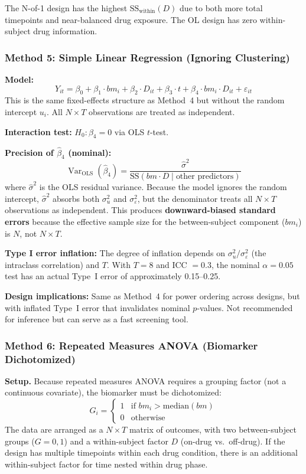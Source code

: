 \documentclass[11pt,letterpaper]{article}
\begin{document}
The N-of-1 design has the highest $\text{SS}_{\text{within}}(D)$ due to
both more total timepoints and near-balanced drug exposure. The OL
design has zero within-subject drug information.

\subsubsection{Method 5: Simple Linear Regression (Ignoring Clustering)}

\textbf{Model:}
\[
Y_{it} = \beta_0 + \beta_1 \cdot bm_i + \beta_2 \cdot D_{it}
+ \beta_3 \cdot t + \beta_4 \cdot bm_i \cdot D_{it}
+ \varepsilon_{it}
\]
This is the same fixed-effects structure as Method~4 but without the
random intercept $u_i$. All $N \times T$ observations are treated as
independent.

\textbf{Interaction test:} $H_0: \beta_4 = 0$ via OLS $t$-test.

\textbf{Precision of $\hat{\beta}_4$ (nominal):}
\[
\operatorname{Var}_{\text{OLS}}(\hat{\beta}_4) =
\frac{\hat{\sigma}^2}{\text{SS}(bm \cdot D \mid
\text{other predictors})}
\]
where $\hat{\sigma}^2$ is the OLS residual variance. Because the model
ignores the random intercept, $\hat{\sigma}^2$ absorbs both
$\sigma^2_u$ and $\sigma^2_\varepsilon$, but the denominator treats all
$N \times T$ observations as independent. This produces
\textbf{downward-biased standard errors} because the effective sample
size for the between-subject component ($bm_i$) is $N$, not $N \times T$.

\textbf{Type I error inflation:} The degree of inflation depends on
$\sigma^2_u / \sigma^2_\varepsilon$ (the intraclass correlation) and
$T$. With $T = 8$ and ICC $= 0.3$, the nominal $\alpha = 0.05$ test
has an actual Type~I error of approximately 0.15--0.25.

\textbf{Design implications:} Same as Method~4 for power ordering
across designs, but with inflated Type~I error that invalidates nominal
$p$-values. Not recommended for inference but can serve as a fast
screening tool.

\subsubsection{Method 6: Repeated Measures ANOVA (Biomarker Dichotomized)}

\textbf{Setup.} Because repeated measures ANOVA requires a grouping
factor (not a continuous covariate), the biomarker must be dichotomized:
\[
G_i = \begin{cases} 1 & \text{if } bm_i > \text{median}(bm) \\
0 & \text{otherwise} \end{cases}
\]
The data are arranged as a $N \times T$ matrix of outcomes, with two
between-subject groups ($G = 0, 1$) and a within-subject factor $D$
(on-drug vs.\ off-drug). If the design has multiple timepoints within
each drug condition, there is an additional within-subject factor for
time nested within drug phase.
\end{document}
